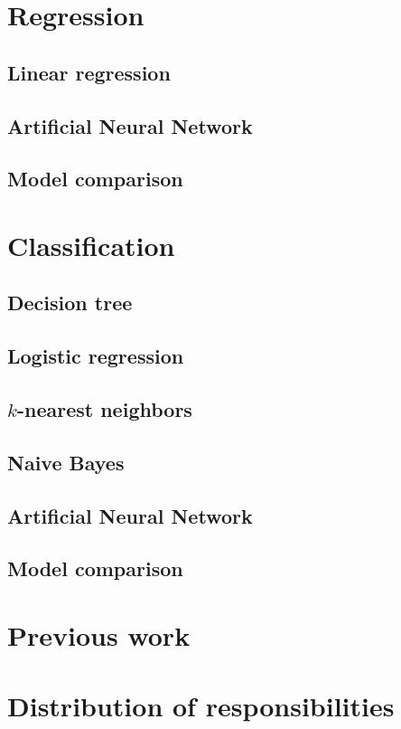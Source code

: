 \section{Regression}

\subsection{Linear regression}

\subsection{Artificial Neural Network}

\subsection{Model comparison}


\section{Classification}

\subsection{Decision tree}

\subsection{Logistic regression}

\subsection{$k$-nearest neighbors}

\subsection{Naive Bayes}

\subsection{Artificial Neural Network}

\subsection{Model comparison}

\section{Previous work}

\appendix
\section{Distribution of responsibilities}